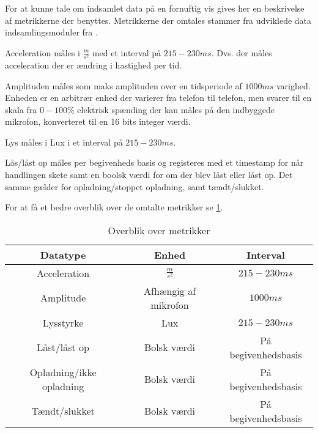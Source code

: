 For at kunne tale om indsamlet data på en fornuftig vis gives her en beskrivelse af metrikkerne der benyttes.
Metrikkerne der omtales stammer fra udviklede data indsamlingsmoduler fra \citet{misc:faellesrapp}.

Acceleration måles i $\frac{m}{s^2}$ med et interval på $215-230 ms$.
Dvs. der måles acceleration der er ændring i hastighed per tid.

Amplituden måles som maks amplituden over en tidsperiode af $1000ms$ varighed.
Enheden er en arbitrær enhed der varierer fra telefon til telefon, men svarer til en skala fra $0-100\%$ elektrisk spænding der kan måles på den indbyggede mikrofon, konverteret til en 16 bits integer værdi.

Lys måles i Lux i et interval på $215-230 ms$.

Lås/låst op måles per begivenheds basis og registeres med et timestamp for når handlingen skete samt en boolsk værdi for om der blev låst eller låst op.
Det samme gælder for opladning/stoppet opladning, samt tændt/slukket.

For at få et bedre overblik over de omtalte metrikker se \cref{tab:metrikker}.

\begin{table}[h]
\begin{tabular}{|c|c|c|}
	\hline Datatype & Enhed & Interval \\ 
	\hline Acceleration & $\frac{m}{s^2}$ & $215-230ms$ \\ 
	\hline Amplitude & Afhængig af mikrofon & $1000ms$ \\ 
	\hline Lysstyrke & Lux & $215-230ms$ \\ 
	\hline Låst/låst op & Bolsk værdi & På begivenhedsbasis \\ 
	\hline Opladning/ikke opladning & Bolsk værdi & På begivenhedsbasis \\ 
	\hline Tændt/slukket & Bolsk værdi & På begivenhedsbasis \\ 
	\hline 
\end{tabular}
\caption{Overblik over metrikker}\label{tab:metrikker} 
\end{table}